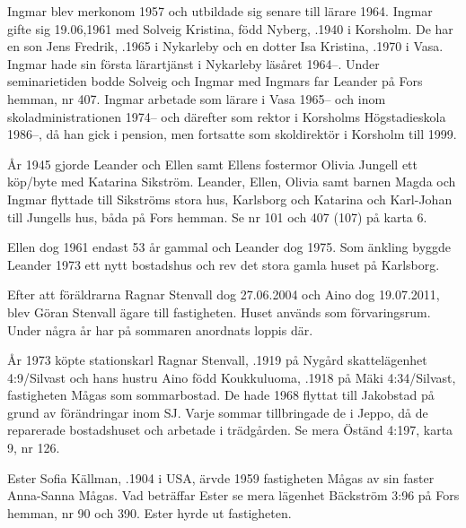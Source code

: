 Ingmar blev merkonom 1957 och utbildade sig senare till lärare 1964. Ingmar gifte sig 19.06,1961 med Solveig Kristina, född Nyberg, .1940 i Korsholm. De har en son Jens Fredrik, .1965 i Nykarleby och en dotter Isa Kristina, .1970 i Vasa. Ingmar hade sin första lärartjänst i Nykarleby läsåret 1964--. Under seminarietiden bodde Solveig och Ingmar med Ingmars far Leander på Fors hemman, nr 407. Ingmar arbetade som lärare i Vasa 1965-- och inom skoladministrationen 1974-- och därefter som rektor i Korsholms Högstadieskola 1986--, då han gick i pension, men fortsatte som skoldirektör i Korsholm till 1999.

År 1945 gjorde Leander och Ellen samt Ellens fostermor Olivia Jungell ett köp/byte med Katarina Sikström. Leander, Ellen, Olivia samt barnen Magda och Ingmar flyttade till Sikströms stora hus, Karlsborg och Katarina och Karl-Johan till Jungells hus, båda på Fors hemman. Se nr 101 och 407 (107) på karta 6.

Ellen dog 1961 endast 53 år gammal och Leander dog 1975. Som änkling byggde Leander 1973 ett nytt bostadshus och rev det stora gamla huset på Karlsborg.





Efter att föräldrarna Ragnar Stenvall dog 27.06.2004 och Aino	dog 19.07.2011, blev Göran Stenvall ägare till fastigheten. Huset används som förvaringsrum. Under några år har på sommaren anordnats loppis där.



År 1973 köpte stationskarl Ragnar Stenvall, .1919 på Nygård skattelägenhet 4:9/Silvast och hans hustru Aino född	Koukkuluoma, .1918 på Mäki 4:34/Silvast, fastigheten Mågas som sommarbostad. De hade 1968 flyttat till Jakobstad på grund av förändringar inom SJ. Varje sommar tillbringade de i Jeppo, då de reparerade bostadshuset och arbetade i trädgården. Se mera Öständ 4:197, karta 9, nr 126.


Ester Sofia Källman, .1904 i USA, ärvde 1959 fastigheten Mågas av sin faster Anna-Sanna Mågas. Vad beträffar Ester se mera lägenhet Bäckström 3:96 på Fors hemman, nr 90 och 390. Ester hyrde ut fastigheten.


